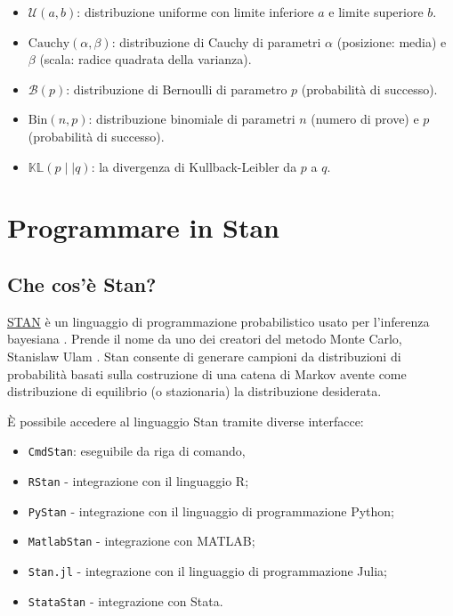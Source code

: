 \documentclass[
  10pt,
  italian,
  a4paper,
  extrafontsizes,onecolumn,openright
  ]{memoir}
\providecommand{\tightlist}{%
  \setlength{\itemsep}{0pt}\setlength{\parskip}{0pt}}
\newlength{\rf}
\newcommand{\R}{\textsf{R}} %
\begin{document}
\begin{itemize}
\item
  \(\mathcal{U}(a, b)\): distribuzione uniforme con limite inferiore \(a\) e limite superiore \(b\).
\item
  \(\mbox{Cauchy}(\alpha, \beta)\): distribuzione di Cauchy di parametri \(\alpha\) (posizione: media) e \(\beta\) (scala: radice quadrata della varianza).
\item
  \(\mathcal{B}(p)\): distribuzione di Bernoulli di parametro \(p\) (probabilità di successo).
\item
  \(\mbox{Bin}(n, p)\): distribuzione binomiale di parametri \(n\) (numero di prove) e \(p\) (probabilità di successo).
\item
  \(\mathbb{KL} (p \mid\mid q)\): la divergenza di Kullback-Leibler da \(p\) a \(q\).
\end{itemize}

\hypertarget{intro-stan}{%
\chapter{Programmare in Stan}\label{intro-stan}}

\hypertarget{che-cosuxe8-stan}{%
\section{Che cos'è Stan?}\label{che-cosuxe8-stan}}

\href{http://mc-stan.org/}{STAN} è un linguaggio di programmazione probabilistico usato per l'inferenza bayesiana \autocite{carpenter2017stan}. Prende il nome da uno dei creatori del metodo Monte Carlo, Stanislaw Ulam \autocite{Eckhardt1987stan}. Stan consente di generare campioni da distribuzioni di probabilità basati sulla costruzione di una catena di Markov avente come distribuzione di equilibrio (o stazionaria) la distribuzione desiderata.

È possibile accedere al linguaggio Stan tramite diverse interfacce:

\begin{itemize}
\tightlist
\item
  \texttt{CmdStan}: eseguibile da riga di comando,
\item
  \texttt{RStan} - integrazione con il linguaggio \R;
\item
  \texttt{PyStan} - integrazione con il linguaggio di programmazione Python;
\item
  \texttt{MatlabStan} - integrazione con MATLAB;
\item
  \texttt{Stan.jl} - integrazione con il linguaggio di programmazione Julia;
\item
  \texttt{StataStan} - integrazione con Stata.
\end{itemize}
\end{document}
